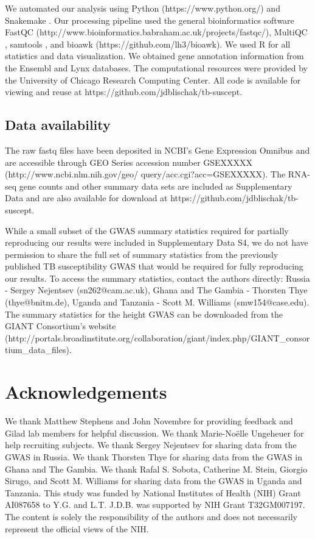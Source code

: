 \documentclass[fleqn,10pt]{wlscirep}
\begin{document}
We automated our analysis using Python (https://www.python.org/) and
Snakemake \cite{Koster2012}. Our processing pipeline used the general
bioinformatics software FastQC
(http://www.bioinformatics.babraham.ac.uk/projects/fastqc/), MultiQC
\cite{Ewels2016}, samtools \cite{Li2009}, and bioawk
(https://github.com/lh3/bioawk). We used R \cite{R2015} for all
statistics and data visualization. We obtained gene annotation
information from the Ensembl \cite{Yates2016} and Lynx
\cite{Sulakhe2016} databases. The computational resources were
provided by the University of Chicago Research Computing Center. All
code is available for viewing and reuse at
https://github.com/jdblischak/tb-suscept.
\subsection*{Data availability}

The raw fastq files have been deposited in NCBI's Gene Expression
Omnibus \cite{Edgar2002} and are accessible through GEO Series
accession number GSEXXXXX (http://www.ncbi.nlm.nih.gov/geo/
query/acc.cgi?acc=GSEXXXXX). The RNA-seq gene counts and other summary
data sets are included as Supplementary Data and are also available
for download at https://github.com/jdblischak/tb-suscept.

While a small subset of the GWAS summary statistics required for
partially reproducing our results were included in Supplementary Data
S4, we do not have permission to share the full set of summary
statistics from the previously published TB susceptibility GWAS that
would be required for fully reproducing our results. To access the
summary statistics, contact the authors directly: Russia - Sergey
Nejentsev (sn262@cam.ac.uk), Ghana and The Gambia - Thorsten Thye
(thye@bnitm.de), Uganda and Tanzania - Scott M. Williams
(smw154@case.edu). The summary statistics for the height GWAS can be
downloaded from the GIANT Consortium’s website
(http://portals.broadinstitute.org/collaboration/giant/index.php/GIANT\_consortium\_data\_files).
\section*{Acknowledgements}

We thank Matthew Stephens and John Novembre for providing feedback and
Gilad lab members for helpful discussion. We thank Marie-Noëlle
Ungeheuer for help recruiting subjects. We thank Sergey Nejentsev for
sharing data from the GWAS in Russia. We thank Thorsten Thye for
sharing data from the GWAS in Ghana and The Gambia. We thank Rafal S.
Sobota, Catherine M. Stein, Giorgio Sirugo, and Scott M. Williams for
sharing data from the GWAS in Uganda and Tanzania. This study was
funded by National Institutes of Health (NIH) Grant AI087658 to Y.G.
and L.T. J.D.B. was supported by NIH Grant T32GM007197. The content is
solely the responsibility of the authors and does not necessarily
represent the official views of the NIH.
\end{document}
